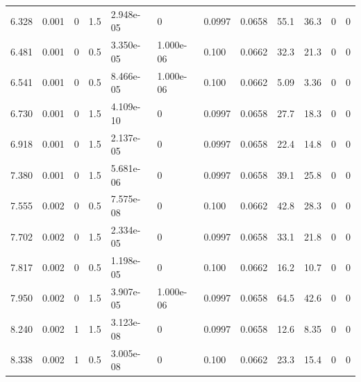 \documentclass[preview]{standalone}
\begin{document}
{{\begin{tabular}{L{1.2cm}C{1.2cm} C{0.3cm}C{0.5cm} C{1.4cm}C{1.4cm} C{1.4cm}C{1.4cm} C{1.6cm}C{1.6cm} C{1.6cm}C{1.6cm}}
  6.328  &  0.001  & 0     & 1.5 &  2.948e-05  & 0  &  0.0997&   0.0658& 55.1 & 36.3   &  0 & 0  \\ 
  6.481  &  0.001  & 0     & 0.5 &  3.350e-05  & 1.000e-06  &  0.100&   0.0662& 32.3 & 21.3   &  0 & 0  \\ 
  6.541  &  0.001  & 0     & 0.5 &  8.466e-05  & 1.000e-06  &  0.100&   0.0662& 5.09 & 3.36   &  0 & 0  \\ 
  6.730  &  0.001  & 0     & 1.5 &  4.109e-10  & 0  &  0.0997&   0.0658& 27.7 & 18.3   &  0 & 0  \\ 
  6.918  &  0.001  & 0     & 1.5 &  2.137e-05  & 0  &  0.0997&   0.0658& 22.4 & 14.8   &  0 & 0  \\ 
  7.380  &  0.001  & 0     & 1.5 &  5.681e-06  & 0  &  0.0997&   0.0658& 39.1 & 25.8   &  0 & 0  \\ 
  7.555  &  0.002  & 0     & 0.5 &  7.575e-08  & 0  &  0.100&   0.0662& 42.8 & 28.3   &  0 & 0  \\ 
  7.702  &  0.002  & 0     & 1.5 &  2.334e-05  & 0  &  0.0997&   0.0658& 33.1 & 21.8   &  0 & 0  \\ 
  7.817  &  0.002  & 0     & 0.5 &  1.198e-05  & 0  &  0.100&   0.0662& 16.2 & 10.7   &  0 & 0  \\ 
  7.950  &  0.002  & 0     & 1.5 &  3.907e-05  & 1.000e-06  &  0.0997&   0.0658& 64.5 & 42.6   &  0 & 0  \\ 
  8.240  &  0.002  & 1     & 1.5 &  3.123e-08  & 0  &  0.0997&   0.0658& 12.6 & 8.35   &  0 & 0  \\ 
  8.338  &  0.002  & 1     & 0.5 &  3.005e-08  & 0  &  0.100&   0.0662& 23.3 & 15.4   &  0 & 0  \\ 
\hline 
\end{tabular} 

}}
\end{document}
